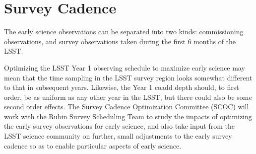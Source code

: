 \section{Survey Cadence}


The early science observations can be separated into two kinds: commissioning observations, and survey observations taken during the first 6 months of the LSST.

Optimizing the LSST Year 1 observing schedule to maximize early science may mean that the time sampling in the LSST survey region looks somewhat different to that in subsequent years.
Likewise, the Year 1 coadd depth should, to first order, be as uniform as any other year in the LSST, but there could also be some second order effects.
The Survey Cadence Optimization Committee (SCOC) will work with the Rubin Survey Scheduling Team to study the impacts of optimizing the early survey observations for early science, and also take input from the LSST science community on further, small adjustments to the early survey cadence so as to enable particular aspects of early science.
